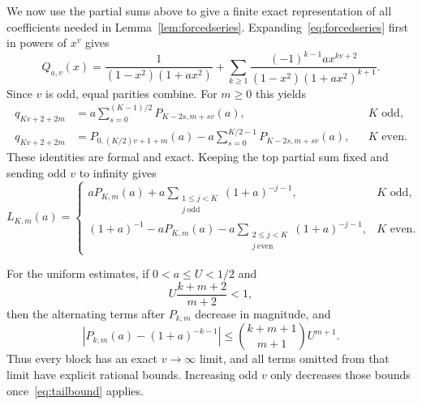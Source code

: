 \documentclass[11pt]{article}
\theoremstyle{remark}
\numberwithin{equation}{section}
\begin{document}
We now use the partial sums above to give a finite exact representation of all
coefficients needed in Lemma~\ref{lem:forcedseries}.
Expanding~\eqref{eq:forcedseries} first in powers of $x^v$ gives
\begin{equation}\label{eq:blockexpansion}
 Q_{a,v}(x)=\frac1{(1-x^2)(1+a x^2)}+
 \sum_{k\ge1}\frac{(-1)^{k-1}a x^{kv+2}}
 {(1-x^2)(1+a x^2)^{k+1}}.
\end{equation}
Since $v$ is odd, equal parities combine.  For $m\ge0$ this yields
\begin{align}
 q_{Kv+2+2m}
 &=a\sum_{s=0}^{(K-1)/2}P_{K-2s,m+sv}(a), &&K\text{ odd},
 \label{eq:oddblock}\\
 q_{Kv+2+2m}
 &=P_{0,(K/2)v+1+m}(a)
   -a\sum_{s=0}^{K/2-1}P_{K-2s,m+sv}(a), &&K\text{ even}.
 \label{eq:evenblock}
\end{align}
These identities are formal and exact.
Keeping the top partial sum fixed and sending odd $v$ to infinity gives
\begin{equation}\label{eq:blocklimit}
 L_{K,m}(a)=
 \begin{cases}
 aP_{K,m}(a)+a\displaystyle\sum_{\substack{1\le j<K\\j\ \mathrm{odd}}}
 (1+a)^{-j-1},&K\text{ odd},\\[2mm]
 (1+a)^{-1}-aP_{K,m}(a)
 -a\displaystyle\sum_{\substack{2\le j<K\\j\ \mathrm{even}}}
 (1+a)^{-j-1},&K\text{ even}.
 \end{cases}
\end{equation}

For the uniform estimates, if $0<a\le U<1/2$ and
\[
 U\frac{k+m+2}{m+2}<1,
\]
then the alternating terms after $P_{k,m}$ decrease in magnitude, and
\begin{equation}\label{eq:tailbound}
 \left|P_{k,m}(a)-(1+a)^{-k-1}\right|
 \le {k+m+1\choose m+1}U^{m+1}.
\end{equation}
Thus every block has an exact $v\to\infty$ limit, and all terms omitted from
that limit have explicit rational bounds.  Increasing odd $v$ only decreases
those bounds once~\eqref{eq:tailbound} applies.
\end{document}
